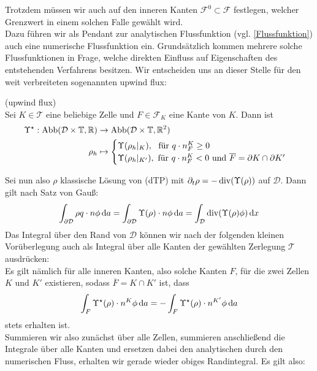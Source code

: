Trotzdem müssen wir auch auf den inneren Kanten $ \mathcal{F}^0 \subset \mathcal{F} $ festlegen, welcher Grenzwert in einem solchen Falle gewählt wird. \\
Dazu führen wir als Pendant zur analytischen Flussfunktion (vgl. \ref{Flussfunktion})
auch eine numerische Flussfunktion ein. Grundsätzlich kommen mehrere solche Flussfunktionen in Frage, welche direkten Einfluss auf Eigenschaften des entstehenden Verfahrens besitzen. Wir entscheiden uns an dieser Stelle für den weit verbreiteten 
sogenannten upwind flux:
\begin{Definition}(upwind flux)\\
	Sei $K \in \mathcal{T}$ eine beliebige Zelle und $ F \in \mathcal{F}_K$ eine Kante von $K$. Dann ist
	\begin{align*}
		\Upsilon^{\star} : \text{Abb}(\mathcal{D}\times\mathbb{T},\mathbb{R}) &\to \text{Abb}(\mathcal{D}\times\mathbb{T},\mathbb{R}^2) \\
		\rho_h &\mapsto 
		\begin{cases}
			\Upsilon(\rho_h|_K) , \ \text{ für } q\cdot n_F^K \geq 0 \\  
			\Upsilon(\rho_h|_{K'}) ,\text{ für } q\cdot n_F^K < 0 \text{ und } \overline{F} = \partial K \cap \partial K'
		\end{cases}
	\end{align*}
\end{Definition}
Sei nun also $ \rho $ klassische Lösung von (dTP) mit $ \partial_t \rho = -\operatorname{div}(\Upsilon(\rho)) $ auf $ \mathcal{D} $. Dann gilt nach Satz von Gauß:
\begin{align}
		\label{gaus1}
		\int_{\partial \mathcal{D}} \rho q \cdot n \phi \, \mathrm{d} a  =\int_{\partial \mathcal{D}} \Upsilon(\rho) \cdot n \phi \, \mathrm{d} a = \int_{\mathcal{D}} \operatorname{div} (\Upsilon(\rho)\phi) \, \mathrm{d} x
\end{align}
Das Integral über den Rand von $ \mathcal{D} $ können wir nach der folgenden kleinen Vorüberlegung auch als Integral über alle Kanten der gewählten Zerlegung $ \mathcal{T} $ ausdrücken: \\
Es gilt nämlich für alle inneren Kanten, also solche Kanten $ F $, für die zwei Zellen $ K $ und $ K' $ existieren, sodass $ \overline{F} = K \cap K' $ ist, dass \[ \int_F \Upsilon^{\star}(\rho) \cdot n^K \phi \, \mathrm{d} a = - \int_F \Upsilon^{\star}(\rho) \cdot n^{K'} \phi \, \mathrm{d} a \] stets erhalten ist. \\
Summieren wir also zunächst über alle Zellen, summieren anschließend die Integrale über alle Kanten und ersetzen dabei den analytischen durch den numerischen Fluss, erhalten wir gerade wieder obiges Randintegral. Es gilt also:
